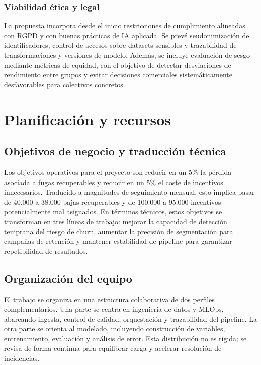 ﻿\documentclass[12pt,a4paper]{article}
\begin{document}
\subsubsection{Viabilidad ética y legal}

La propuesta incorpora desde el inicio restricciones de cumplimiento alineadas con RGPD y con buenas prácticas de IA aplicada. Se prevé seudonimización de identificadores, control de accesos sobre datasets sensibles y trazabilidad de transformaciones y versiones de modelo. Además, se incluye evaluación de sesgo mediante métricas de equidad, con el objetivo de detectar desviaciones de rendimiento entre grupos y evitar decisiones comerciales sistemáticamente desfavorables para colectivos concretos.

\section{Planificación y recursos}

\subsection{Objetivos de negocio y traducción técnica}

Los objetivos operativos para el proyecto son reducir en un 5\% la pérdida asociada a fugas recuperables y reducir en un 5\% el coste de incentivos innecesarios. Traducido a magnitudes de seguimiento mensual, esto implica pasar de 40.000 a 38.000 bajas recuperables y de 100.000 a 95.000 incentivos potencialmente mal asignados. En términos técnicos, estos objetivos se transforman en tres líneas de trabajo: mejorar la capacidad de detección temprana del riesgo de churn, aumentar la precisión de segmentación para campañas de retención y mantener estabilidad de pipeline para garantizar repetibilidad de resultados.

\subsection{Organización del equipo}

El trabajo se organiza en una estructura colaborativa de dos perfiles complementarios. Una parte se centra en ingeniería de datos y MLOps, abarcando ingesta, control de calidad, orquestación y trazabilidad del pipeline. La otra parte se orienta al modelado, incluyendo construcción de variables, entrenamiento, evaluación y análisis de error. Esta distribución no es rígida; se revisa de forma continua para equilibrar carga y acelerar resolución de incidencias.
\end{document}
